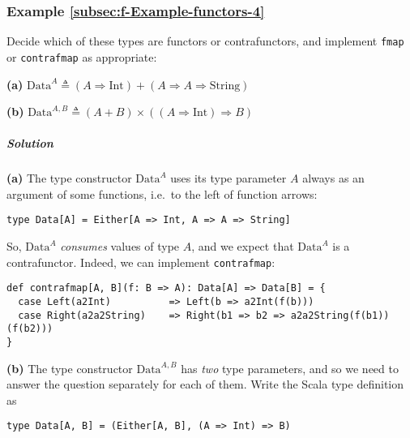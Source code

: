 \subsubsection{Example \label{subsec:f-Example-functors-4}\ref{subsec:f-Example-functors-4}}

Decide which of these types are functors or contrafunctors, and implement
\lstinline!fmap! or \lstinline!contrafmap! as appropriate:

\textbf{(a)} $\text{Data}^{A}\triangleq\left(A\Rightarrow\text{Int}\right)+(A\Rightarrow A\Rightarrow\text{String})$ 

\textbf{(b)} $\text{Data}^{A,B}\triangleq\left(A+B\right)\times\left(\left(A\Rightarrow\text{Int}\right)\Rightarrow B\right)$

\subparagraph{Solution}

\textbf{(a)} The type constructor $\text{Data}^{A}$ uses its type
parameter $A$ always as an argument of some functions, i.e.~to the
left of function arrows:
\begin{lstlisting}
type Data[A] = Either[A => Int, A => A => String]
\end{lstlisting}
So, $\text{Data}^{A}$ \emph{consumes} values of type $A$, and we
expect that $\text{Data}^{A}$ is a contrafunctor. Indeed, we can
implement \lstinline!contrafmap!:
\begin{lstlisting}
def contrafmap[A, B](f: B => A): Data[A] => Data[B] = {
  case Left(a2Int)          => Left(b => a2Int(f(b)))
  case Right(a2a2String)    => Right(b1 => b2 => a2a2String(f(b1))(f(b2)))
}
\end{lstlisting}

\textbf{(b)} The type constructor $\text{Data}^{A,B}$ has \emph{two}
type parameters, and so we need to answer the question separately
for each of them. Write the Scala type definition as
\begin{lstlisting}
type Data[A, B] = (Either[A, B], (A => Int) => B)
\end{lstlisting}

